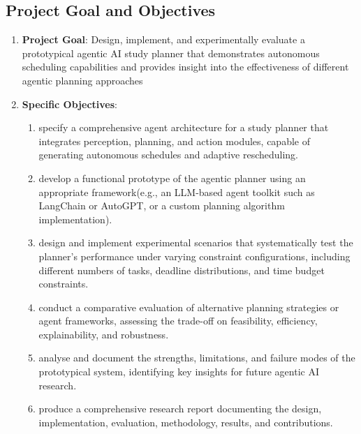 \documentclass[12pt]{article}
\begin{document}
\subsection{Project Goal and Objectives}
\begin{enumerate}
    \item \textbf{Project Goal}: Design, implement, and experimentally evaluate a prototypical agentic AI study planner that demonstrates autonomous scheduling capabilities and provides insight into the effectiveness of different agentic planning approaches
    \item \textbf{Specific Objectives}:
    \begin{enumerate}
        \item specify a comprehensive agent architecture for a study planner that integrates perception, planning, and action modules, capable of generating autonomous schedules and adaptive rescheduling.
        \item develop a functional prototype of the agentic planner using an appropriate framework(e.g., an LLM-based agent toolkit such as LangChain or AutoGPT, or a custom planning algorithm implementation).
        \item design and implement experimental scenarios that systematically test the planner's performance under varying constraint configurations, including different numbers of tasks, deadline distributions, and time budget constraints.
        \item  conduct a comparative evaluation of alternative planning strategies or agent frameworks, assessing the trade-off on feasibility, efficiency, explainability, and robustness.
        \item  analyse and document the strengths, limitations, and failure modes of the prototypical system, identifying key insights for future agentic AI research.
        \item  produce a comprehensive research report documenting the design, implementation, evaluation, methodology, results, and contributions.
    \end{enumerate}
\end{enumerate}
\end{document}
